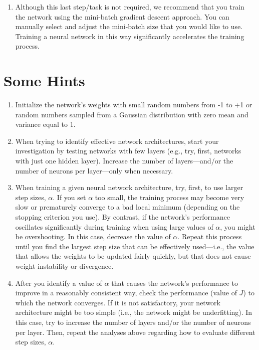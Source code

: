 \documentclass[letterpaper]{article}
\begin{document}
\begin{enumerate}
    \item Although this last step/task is not required, we recommend that you train the network using the mini-batch gradient descent approach. You can manually select and adjust the mini-batch size that you would like to use. Training a neural network in this way significantly accelerates the training process.
    
\end{enumerate}

\section{Some Hints}

\begin{enumerate}
	\item Initialize the network's weights with small random numbers from -1 to +1 or random numbers sampled from a Gaussian distribution with zero mean and variance equal to 1.
	\item When trying to identify effective network architectures, start your investigation by testing networks with few layers (e.g., try, first, networks with just one hidden layer). Increase the number of layers---and/or the number of neurons per layer---only when necessary.
	\item When training a given neural network architecture, try, first, to use larger step sizes, $\alpha$. If you set $\alpha$ too small, the training process may become very slow or prematurely converge to a bad local minimum (depending on the stopping criterion you use). By contrast, if the network's performance oscillates significantly during training when using large values of $\alpha$, you might be overshooting. In this case, decrease the value of $\alpha$. Repeat this process until you find the largest step size that can be effectively used---i.e., the value that allows the weights to be updated fairly quickly, but that does not cause weight instability or divergence.
	\item After you identify a value of $\alpha$ that causes the network's performance to improve in a reasonably consistent way, check the performance (value of $J$) to which the network converges. If it is not satisfactory, your network architecture might be too simple (i.e., the network might be underfitting). In this case, try to increase the number of layers and/or the number of neurons per layer. Then, repeat the analyses above regarding how to evaluate different step sizes, $\alpha$.

\end{enumerate}
\end{document}
